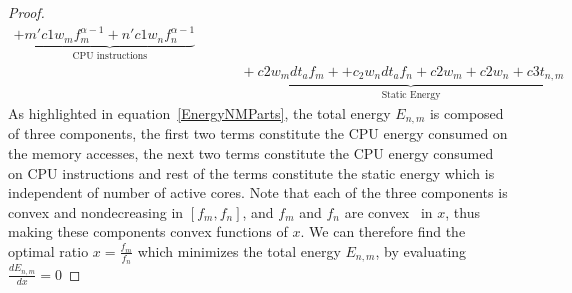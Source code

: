 \documentclass[11pt, letterpaper]{article}
\begin{document}
\begin{proof}
\begin{equation}
\begin{aligned}
             + \underbrace{ m'c1w_mf_m^{\alpha-1} + n'c1w_nf_n^{\alpha-1}}_\text{CPU instructions}\\
           &\qquad\ \ + \underbrace{c2w_mdt_af_m + + c_2w_ndt_af_n + c2w_m + c2w_n + c3t_{n,m}}_\text{Static Energy}
\end{aligned}
\end{equation}
As highlighted in equation~\ref{EnergyNMParts}, the total energy $E_{n,m}$ is composed of three components, the first two terms constitute the CPU energy consumed on the memory accesses, the next two terms constitute the CPU energy consumed on CPU instructions and rest of the terms constitute the static energy which is independent of number of active cores.
Note that each of the three components is convex and nondecreasing in $[f_m,f_n]$, and $f_m$ and $f_n$ are convex~\cite{Boyd} in $x$, thus making these components convex functions of $x$.
We can therefore find the optimal ratio $x = \frac{f_m}{f_n}$ which minimizes the total energy $E_{n,m}$, by evaluating $\frac{dE_{n,m}}{dx} = 0$



\end{proof}
\end{document}
